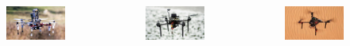 \documentclass[aspectratio=169]{beamer}
\begin{document}
\begin{frame}
\begin{columns}[c]
    \vspace{-1em}

    \begin{figure}
      \centering
      \includegraphics[width=1.0\textwidth]{./fig/uavs/f550_real.jpg}
    \end{figure}


    \begin{figure}
      \centering
      \includegraphics[width=1.0\textwidth]{./fig/uavs/x500_real.jpg}
    \end{figure}

    \vspace{-1em}

    \begin{figure}
      \centering
      \includegraphics[width=1.0\textwidth]{./fig/uavs/t650_real.jpg}
    \end{figure}


\end{columns}
\end{frame}
\end{document}
